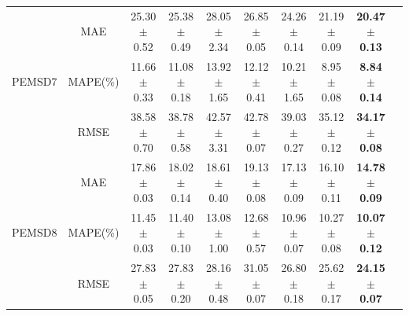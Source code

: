 \begin{table}[!htb]
{\begin{tabular}{cccccccccc}
            \hline
            \multicolumn{1}{c|}{\multirow{3}{*}{PEMSD7}} & \multicolumn{1}{c|}{MAE}      & 25.30 $\pm$ 0.52 & 25.38 $\pm$ 0.49 & 28.05 $\pm$ 2.34 & 26.85 $\pm$ 0.05 & 24.26 $\pm$ 0.14 & 21.19 $\pm$ 0.09 & \textbf{20.47 $\pm$ 0.13} \\
            \multicolumn{1}{c|}{}                        & \multicolumn{1}{c|}{MAPE(\%)} & 11.66 $\pm$ 0.33 & 11.08 $\pm$ 0.18 & 13.92 $\pm$ 1.65 & 12.12 $\pm$ 0.41 & 10.21 $\pm$ 1.65 & 8.95 $\pm$ 0.08  & \textbf{8.84 $\pm$ 0.14}  \\
            \multicolumn{1}{c|}{}                        & \multicolumn{1}{c|}{RMSE}     & 38.58 $\pm$ 0.70 & 38.78 $\pm$ 0.58 & 42.57 $\pm$ 3.31 & 42.78 $\pm$ 0.07 & 39.03 $\pm$ 0.27 & 35.12 $\pm$ 0.12 & \textbf{34.17 $\pm$ 0.08} \\
            \hline
            \multicolumn{1}{c|}{\multirow{3}{*}{PEMSD8}} & \multicolumn{1}{c|}{MAE}      & 17.86 $\pm$ 0.03 & 18.02 $\pm$ 0.14 & 18.61 $\pm$ 0.40 & 19.13 $\pm$ 0.08 & 17.13 $\pm$ 0.09 & 16.10 $\pm$ 0.11 & \textbf{14.78 $\pm$ 0.09} \\
            \multicolumn{1}{c|}{}                        & \multicolumn{1}{c|}{MAPE(\%)} & 11.45 $\pm$ 0.03 & 11.40 $\pm$ 0.10 & 13.08 $\pm$ 1.00 & 12.68 $\pm$ 0.57 & 10.96 $\pm$ 0.07 & 10.27 $\pm$ 0.08 & \textbf{10.07 $\pm$ 0.12} \\
            \multicolumn{1}{c|}{}                        & \multicolumn{1}{c|}{RMSE}     & 27.83 $\pm$ 0.05 & 27.83 $\pm$ 0.20 & 28.16 $\pm$ 0.48 & 31.05 $\pm$ 0.07 & 26.80 $\pm$ 0.18 & 25.62 $\pm$ 0.17 & \textbf{24.15 $\pm$ 0.07} \\
           \bottomrule[2pt]
        \end{tabular}
    }
\end{table}

